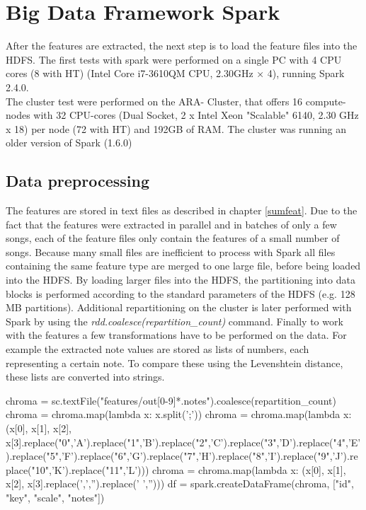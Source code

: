 
\section{Big Data Framework Spark}\label{bds1}

After the features are extracted, the next step is to load the feature files into the HDFS. 
The first tests with spark were performed on a single PC with 4 CPU cores (8 with HT) (Intel Core i7-3610QM CPU, 2.30GHz × 4), running Spark 2.4.0.\\ The cluster test were performed on the ARA- Cluster, that offers 16 compute-nodes with 32 CPU-cores (Dual Socket, 2 x Intel Xeon "Scalable" 6140, 2.30 GHz x 18) per node (72 with HT) and 192GB of RAM. The cluster was running an older version of Spark (1.6.0)\\

\subsection{Data preprocessing}

The features are stored in text files as described in chapter \ref{sumfeat}. Due to the fact that the features were extracted in parallel and in batches of only a few songs, each of the feature files only contain the features of a small number of songs. Because many small files are inefficient to process with Spark \cite[p. 153]{sparkbook1} all files containing the same feature type are merged to one large file, before being loaded into the HDFS. By loading larger files into the HDFS, the partitioning into data blocks is performed according to the standard parameters of the HDFS (e.g. 128 MB partitions). Additional repartitioning on the cluster is later performed with Spark by using the \textit{rdd.coalesce(repartition\_count)} command. 
Finally to work with the features a few transformations have to be performed on the data. For example the extracted note values are stored as lists of numbers, each representing a certain note. To compare these using the Levenshtein distance, these lists are converted into strings. 

\begin{pythonCode}[frame=single,label={lst:prep1},caption={notes preprocessing},captionpos=b]
chroma = sc.textFile("features/out[0-9]*.notes").coalesce(repartition_count)
chroma = chroma.map(lambda x: x.split(';'))
chroma = chroma.map(lambda x: (x[0], x[1], x[2], x[3].replace("0",'A').replace("1",'B').replace("2",'C').replace("3",'D').replace("4",'E').replace("5",'F').replace("6",'G').replace("7",'H').replace("8",'I').replace("9",'J').replace("10",'K').replace("11",'L')))
chroma = chroma.map(lambda x: (x[0], x[1], x[2], x[3].replace(',','').replace(' ','')))
df = spark.createDataFrame(chroma, ["id", "key", "scale", "notes"])
\end{pythonCode}

